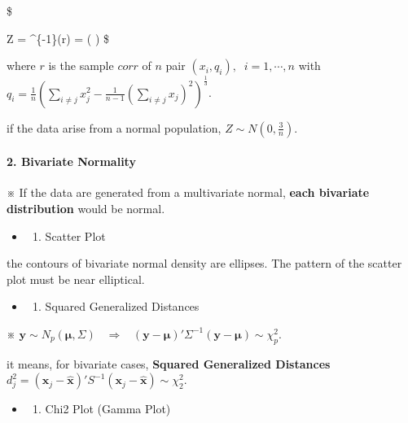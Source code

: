 \documentclass[
]{book}
\providecommand{\tightlist}{%
  \setlength{\itemsep}{0pt}\setlength{\parskip}{0pt}}
\begin{document}
{{{\$

Z = \tanh\^{}\{-1\}(r) =  \ln \left(  \right)
\$

where \(r\) is the sample \(corr\) of \(n\) pair \((x_i , q_i), \; \; i=1, \cdots, n\) with \(q_i = \tfrac {1}{n} \left( \sum_{i \not = j} x_j^2 - \tfrac{1}{n-1} \left( \sum_{i \not = j} x_j\right)^2 \right)^{\tfrac{1}{3}}\).

if the data arise from a normal population, \(Z \sim N(0, \tfrac 3 n)\).

\hypertarget{bivariate-normality}{%
\paragraph{2. Bivariate Normality}\label{bivariate-normality}}

※ If the data are generated from a multivariate normal, \textbf{each bivariate distribution} would be normal.

\begin{itemize}
\item
  \begin{enumerate}
  \def\labelenumi{\arabic{enumi}.}
  \tightlist
  \item
    Scatter Plot
  \end{enumerate}
\end{itemize}

the contours of bivariate normal density are ellipses. The pattern of the scatter plot must be near elliptical.

\begin{itemize}
\item
  \begin{enumerate}
  \def\labelenumi{\arabic{enumi}.}
  \setcounter{enumi}{1}
  \tightlist
  \item
    Squared Generalized Distances
  \end{enumerate}
\end{itemize}

※ \(\pmb y \sim N_p (\pmb \mu, \Sigma) \; \; \; \Longrightarrow \; \; \; (\pmb y - \pmb \mu)' \Sigma^{-1} (\pmb y - \pmb \mu) \sim \chi_p^2\).

it means, for bivariate cases, \textbf{Squared Generalized Distances} \(d_j^2 = (\pmb x_j - \hat {\pmb x})' S^{-1} (\pmb x_j - \hat {\pmb x}) \sim \chi_2^2\).

\begin{itemize}
\item
  \begin{enumerate}
  \def\labelenumi{\arabic{enumi}.}
  \setcounter{enumi}{2}
  \tightlist
  \item
    Chi2 Plot (Gamma Plot)
  \end{enumerate}
\end{itemize}

}}}
\end{document}
